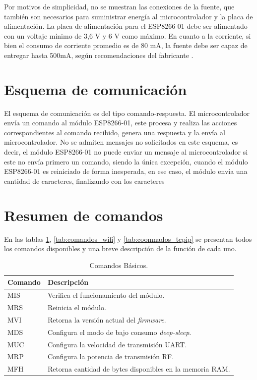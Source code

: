 \documentclass[a4paper,spanish,11pt]{article}
\begin{document}
Por motivos de simplicidad, no se muestran las conexiones de la fuente, que también son necesarios para suministrar energía al microcontrolador y la placa de alimentación. La placa de alimentación para el ESP8266-01 debe ser alimentado con un voltaje mínimo de 3,6 V y 6 V como máximo. En cuanto a la corriente, si bien el consumo de corriente promedio es de 80 mA, la fuente debe ser capaz de entregar hasta 500mA, según recomendaciones del fabricante \cite{ESP8266SYSDESCRIPTION}.

\section{Esquema de comunicación}
El esquema de comunicación es del tipo comando-respuesta. El microcontrolador envía un comando al módulo ESP8266-01, este procesa y realiza las acciones correspondientes al comando recibido, genera una respuesta y la envía al microcontrolador. No se admiten mensajes no solicitados en este esquema, es decir, el módulo ESP8266-01 no puede enviar un mensaje al microcontrolador si este no envía primero un comando, siendo la única excepción, cuando el módulo ESP8266-01 es reiniciado de forma inesperada, en ese caso, el módulo envía una cantidad de caracteres, finalizando con los caracteres %

\section{Resumen de comandos}
En las tablas \ref{tab:comandos_basicos}, \ref{tab:comandos_wifi} y \ref{tab:coomnados_tcpip} se presentan todos los comandos disponibles y una breve descripción de la función de cada uno.


\begin{table}[H]
	\centering
	\renewcommand\arraystretch{1.5}
	\begin{tabular}{@{} ll @{}}
		\toprule
		\textbf{Comando} & \textbf{Descripción} \\ 
		\midrule
		MIS & Verifica el funcionamiento del módulo. \\
		MRS & Reinicia el módulo. \\
		MVI & Retorna la versión actual del \textit{firmware}. \\
		MDS & Configura el modo de bajo consumo \textit{deep-sleep}. \\
		MUC & Configura la velocidad de transmisión UART. \\
		MRP & Configura la potencia de transmisión RF. \\ 
		MFH & Retorna cantidad de bytes disponibles en la memoria RAM. \\
		\bottomrule
	\end{tabular}
	\caption{Comandos Básicos.}
	\label{tab:comandos_basicos}
\end{table}
\end{document}
